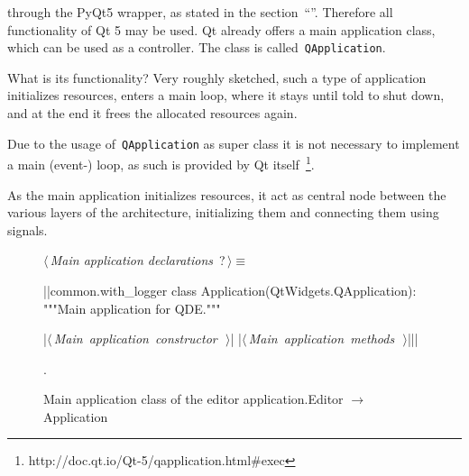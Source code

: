 \documentclass[%
    a4paper,    %
    justified,  %
    nobib,      %
    openany     %
]{tufte-book}
\begin{document}
 through the PyQt5 wrapper, as stated in the
section~\enquote{}. Therefore all
functionality of Qt 5 may be used. Qt already offers a main application class,
which can be used as a controller. The class is called~\verb=QApplication=.

 What is
its functionality? Very roughly sketched, such a type of application initializes
resources, enters a main loop, where it stays until told to shut down, and at
the end it frees the allocated resources again.

Due to the usage of~\verb=QApplication= as super class it is not necessary to
implement a main (event-) loop, as such is provided by Qt
itself~\footnote{http://doc.qt.io/Qt-5/qapplication.html\#exec}.

As the main application initializes resources, it act as central node between the
various layers of the architecture, initializing them and connecting them using
signals.\cite[pp. 37 --- 38]{osterwalder-qde-2016}

\begin{figure}[h]
  \begin{flushleft} \small
\begin{minipage}{\linewidth}\label{scrap12}\raggedright\small
{} $\langle\,${\itshape Main application declarations}\nobreak\ {\footnotesize {?}}$\,\rangle\equiv$
\vspace{-1ex}
\begin{pythoncode}
  |\normalfont{}\fontfamily{}|common.with_logger
  class Application(QtWidgets.QApplication):
      """Main application for QDE."""

      |\hbox{$\langle\,${\itshape Main application constructor}\nobreak\ {\footnotesize {}}$\,\rangle$}|
      |\hbox{$\langle\,${\itshape Main application methods}\nobreak\ {\footnotesize {}}$\,\rangle$}||\NWsep|
\end{pythoncode}
\vspace{1.5ex}
\footnotesize
\begin{list}{}{\setlength{\itemsep}{-\parsep}\setlength{\itemindent}{-\leftmargin}}
\item {\NWtxtMacroNoRef}.

\item{}
\end{list}
\end{minipage}\vspace{4ex}
\end{flushleft}
\caption{Main application class of the editor
    application.\newline{}\newline{}Editor $\rightarrow$ Application}
  \label{editor:lst:app}
\end{figure}
\end{document}
